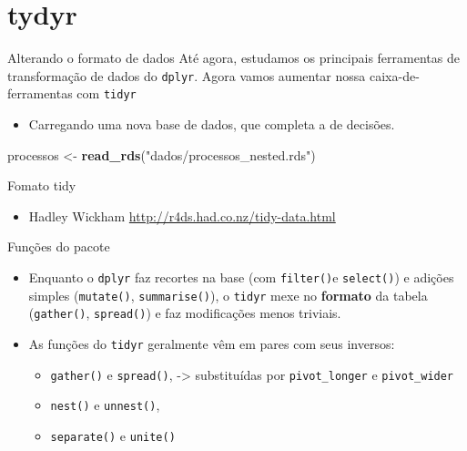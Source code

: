 \documentclass[
  9pt,
  ignorenonframetext,
]{beamer}
\newenvironment{Shaded}{\begin{snugshade}}{\end{snugshade}}
\newcommand{\KeywordTok}[1]{\textcolor[rgb]{0.13,0.29,0.53}{\textbf{#1}}}
\newcommand{\NormalTok}[1]{#1}
\newcommand{\StringTok}[1]{\textcolor[rgb]{0.31,0.60,0.02}{#1}}
\providecommand{\tightlist}{%
  \setlength{\itemsep}{0pt}\setlength{\parskip}{0pt}}
\begin{document}
\hypertarget{tydyr}{%
\section{tydyr}\label{tydyr}}

\begin{frame}[fragile]{Alterando o formato de dados}
\protect\hypertarget{alterando-o-formato-de-dados}{}
Até agora, estudamos os principais ferramentas de transformação de dados
do \texttt{dplyr}. Agora vamos aumentar nossa caixa-de-ferramentas com
\texttt{tidyr}

\begin{itemize}
\tightlist
\item
  Carregando uma nova base de dados, que completa a de decisões.
\end{itemize}

\begin{Shaded}
\begin{Highlighting}[]
\NormalTok{processos \textless{}{-}}\StringTok{ }\KeywordTok{read\_rds}\NormalTok{(}\StringTok{"dados/processos\_nested.rds"}\NormalTok{)}
\end{Highlighting}
\end{Shaded}
\end{frame}

\begin{frame}{Fomato tidy}
\protect\hypertarget{fomato-tidy}{}
\begin{itemize}
\tightlist
\item
  Hadley Wickham \url{http://r4ds.had.co.nz/tidy-data.html}
\end{itemize}
\end{frame}

\begin{frame}[fragile]{Funções do pacote}
\protect\hypertarget{funuxe7uxf5es-do-pacote}{}
\begin{itemize}
\item
  Enquanto o \texttt{dplyr} faz recortes na base (com \texttt{filter()}e
  \texttt{select()}) e adições simples (\texttt{mutate()},
  \texttt{summarise()}), o \texttt{tidyr} mexe no \textbf{formato} da
  tabela (\texttt{gather()}, \texttt{spread()}) e faz modificações menos
  triviais.
\item
  As funções do \texttt{tidyr} geralmente vêm em pares com seus
  inversos:

  \begin{itemize}
  \tightlist
  \item
    \texttt{gather()} e \texttt{spread()}, -\textgreater{} substituídas
    por \texttt{pivot\_longer} e \texttt{pivot\_wider}
  \item
    \texttt{nest()} e \texttt{unnest()},
  \item
    \texttt{separate()} e \texttt{unite()}
  \end{itemize}
\end{itemize}
\end{frame}
\end{document}
